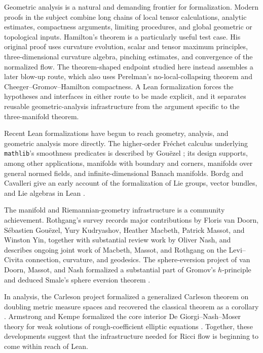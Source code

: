 \documentclass[11pt]{article}
\theoremstyle{plain}
\theoremstyle{definition}
\theoremstyle{remark}
\begin{document}
Geometric analysis is a natural and demanding frontier for formalization.
Modern proofs in the subject combine long chains of local tensor calculations,
analytic estimates, compactness arguments, limiting procedures, and global
geometric or topological inputs.  Hamilton's theorem is a particularly useful
test case.  His original proof uses curvature evolution, scalar and tensor
maximum principles, three-dimensional curvature algebra, pinching estimates,
and convergence of the normalized flow.  The theorem-shaped endpoint studied
here instead assembles a later blow-up route, which also uses Perelman's
no-local-collapsing theorem and Cheeger--Gromov--Hamilton compactness.  A Lean
formalization forces the hypotheses and interfaces in either route to be made
explicit, and it separates reusable geometric-analysis infrastructure from the
argument specific to the three-manifold theorem.

Recent Lean formalizations have begun to reach geometry, analysis, and
geometric analysis more directly.  The higher-order Fr\'echet calculus
underlying \texttt{mathlib}'s smoothness predicates is described by
Gou\"ezel \cite{GouezelHigherOrderCalculus}; its design supports, among other
applications, manifolds with boundary and corners, manifolds over general
normed fields, and infinite-dimensional Banach manifolds.  Bordg and Cavalleri
give an early account of the formalization of Lie groups, vector bundles, and
Lie algebras in Lean \cite{BordgCavalleriDGLean}.

The manifold and Riemannian-geometry infrastructure is a community
achievement.  Rothgang's survey \cite{RothgangDGMathlib} records major
contributions by Floris van Doorn, S\'ebastien Gou\"ezel, Yury Kudryashov,
Heather Macbeth, Patrick Massot, and Winston Yin, together with substantial
review work by Oliver Nash, and describes ongoing joint work of Macbeth,
Massot, and Rothgang on the Levi--Civita connection, curvature, and geodesics.
The sphere-eversion project of van Doorn, Massot, and Nash formalized a
substantial part of Gromov's \(h\)-principle and deduced Smale's sphere
eversion theorem \cite{MassotVanDoornNashSphereEversion}.


In analysis, the Carleson project
formalized a generalized Carleson theorem on doubling metric measure spaces and
recovered the classical theorem as a corollary \cite{CarlesonLean}.  Armstrong
and Kempe formalized the core interior De Giorgi--Nash--Moser theory for weak
solutions of rough-coefficient elliptic equations \cite{ArmstrongKempeDGNM}.
Together, these developments suggest that the infrastructure needed for Ricci
flow is beginning to come within reach of Lean.
\end{document}
